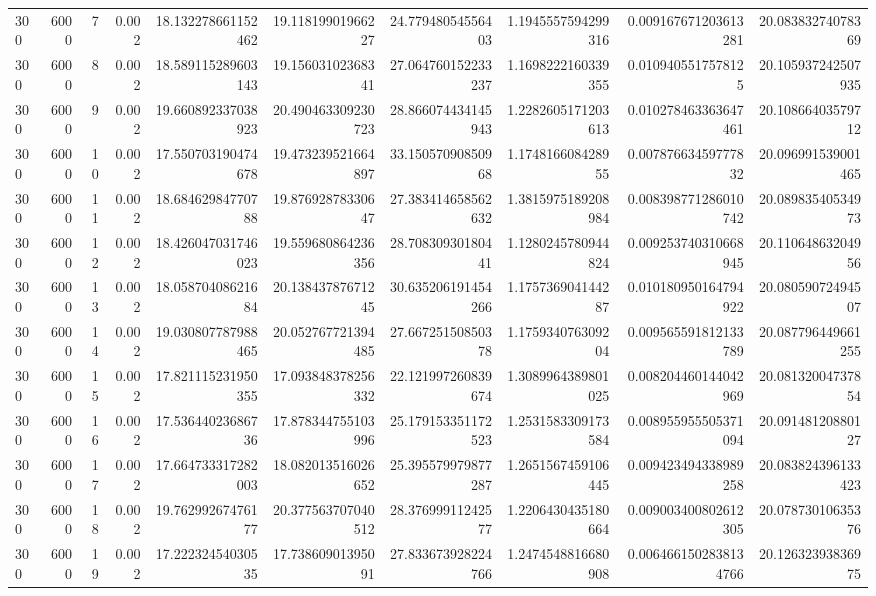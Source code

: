 \begin{tabular}{lrrrrrrrrr}
300 & 6000 & 7 & 0.002 & 18.132278661152462 & 19.11819901966227 & 24.77948054556403 & 1.1945557594299316 & 0.009167671203613281 & 20.08383274078369 \\
300 & 6000 & 8 & 0.002 & 18.589115289603143 & 19.15603102368341 & 27.064760152233237 & 1.1698222160339355 & 0.0109405517578125 & 20.105937242507935 \\
300 & 6000 & 9 & 0.002 & 19.660892337038923 & 20.490463309230723 & 28.866074434145943 & 1.2282605171203613 & 0.010278463363647461 & 20.10866403579712 \\
300 & 6000 & 10 & 0.002 & 17.550703190474678 & 19.473239521664897 & 33.15057090850968 & 1.174816608428955 & 0.00787663459777832 & 20.096991539001465 \\
300 & 6000 & 11 & 0.002 & 18.68462984770788 & 19.87692878330647 & 27.383414658562632 & 1.3815975189208984 & 0.008398771286010742 & 20.08983540534973 \\
300 & 6000 & 12 & 0.002 & 18.426047031746023 & 19.559680864236356 & 28.70830930180441 & 1.1280245780944824 & 0.009253740310668945 & 20.11064863204956 \\
300 & 6000 & 13 & 0.002 & 18.05870408621684 & 20.13843787671245 & 30.635206191454266 & 1.175736904144287 & 0.010180950164794922 & 20.08059072494507 \\
300 & 6000 & 14 & 0.002 & 19.030807787988465 & 20.052767721394485 & 27.66725150850378 & 1.175934076309204 & 0.009565591812133789 & 20.087796449661255 \\
300 & 6000 & 15 & 0.002 & 17.821115231950355 & 17.093848378256332 & 22.121997260839674 & 1.3089964389801025 & 0.008204460144042969 & 20.08132004737854 \\
300 & 6000 & 16 & 0.002 & 17.53644023686736 & 17.878344755103996 & 25.179153351172523 & 1.2531583309173584 & 0.008955955505371094 & 20.09148120880127 \\
300 & 6000 & 17 & 0.002 & 17.664733317282003 & 18.082013516026652 & 25.395579979877287 & 1.2651567459106445 & 0.009423494338989258 & 20.083824396133423 \\
300 & 6000 & 18 & 0.002 & 19.76299267476177 & 20.377563707040512 & 28.37699911242577 & 1.2206430435180664 & 0.009003400802612305 & 20.07873010635376 \\
300 & 6000 & 19 & 0.002 & 17.22232454030535 & 17.73860901395091 & 27.833673928224766 & 1.2474548816680908 & 0.0064661502838134766 & 20.12632393836975 \\
\hline
\end{tabular}
